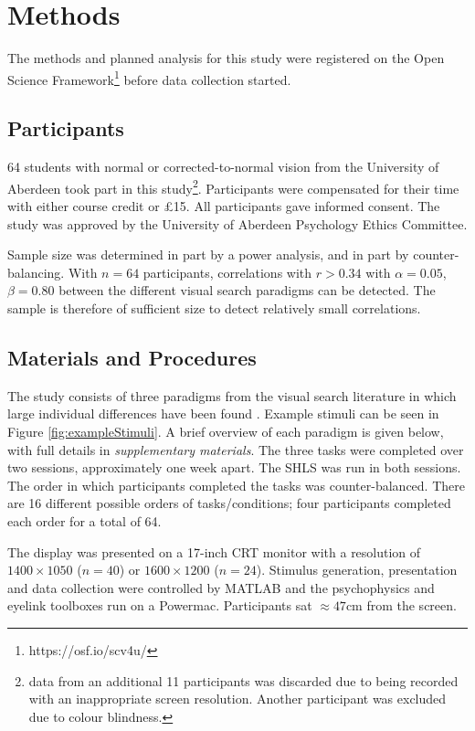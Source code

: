 \documentclass[Afour, sageapa, times]{sagej}
\begin{document}
\section{Methods}

The methods and planned analysis for this study were registered on the Open Science Framework\footnote{https://osf.io/scv4u/} before data collection started.

\subsection{Participants}
64 students with normal or corrected-to-normal vision from the University of Aberdeen took part in this study\footnote{data from an additional 11 participants was discarded due to being recorded with an inappropriate screen resolution. Another participant was excluded due to colour blindness.}. Participants were compensated for their time with either course credit or \pounds 15. All participants gave informed consent. The study was approved by the University of Aberdeen Psychology Ethics Committee. 

Sample size was determined in part by a power analysis, and in part by counter-balancing. With $n = 64$ participants, correlations with $r > 0.34$ with $\alpha = 0.05$, $\beta = 0.80$ between the different visual search paradigms can be detected. The sample is therefore of sufficient size to detect relatively small correlations.

\subsection{Materials and Procedures}

The study consists of three paradigms from the visual search literature in which large individual differences have been  found \cite{nowakowska2017, irons-leber2016, kristjansson2014}. Example stimuli can be seen in Figure \ref{fig:exampleStimuli}. A brief overview of each paradigm is given below, with full details in \textit{supplementary materials}. The three tasks were completed over two sessions, approximately one week apart. The SHLS was run in both sessions. The order in which participants completed the tasks was counter-balanced. There are 16 different possible orders of tasks/conditions; four participants completed each order for a total of 64.

The display was presented on a 17-inch CRT monitor with a resolution of $1400 \times 1050$ ($n = 40$) or $1600 \times 1200$ ($n = 24$). Stimulus generation, presentation and data collection were controlled by MATLAB and the psychophysics and eyelink toolboxes  \cite{brainard1997,cornelissen2002,kleiners2007} run on a Powermac. Participants sat $\approx 47$cm from the screen.
\end{document}
